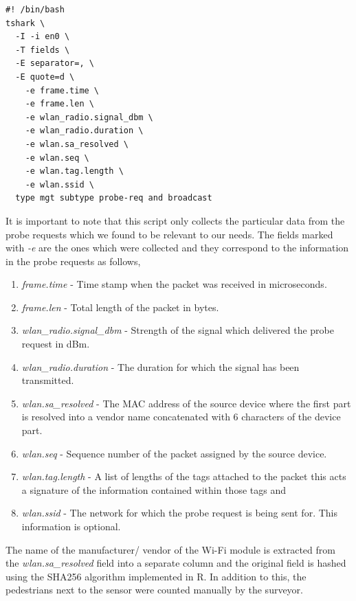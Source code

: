 \begin{verbatim}
#! /bin/bash
tshark \
  -I -i en0 \
  -T fields \
  -E separator=, \
  -E quote=d \
    -e frame.time \
    -e frame.len \
    -e wlan_radio.signal_dbm \
    -e wlan_radio.duration \
    -e wlan.sa_resolved \
    -e wlan.seq \
    -e wlan.tag.length \
    -e wlan.ssid \
  type mgt subtype probe-req and broadcast
\end{verbatim}

It is important to note that this script only collects the particular data from the probe requests which we found to be relevant to our needs. 
The fields marked with \textit{-e} are the ones which were collected and they correspond to the information in the probe requests as follows,

\begin{enumerate}[rightmargin = 2em, leftmargin = 2em]
  \itemsep-0.25em
  \item \textit{frame.time} - Time stamp when the packet was received in microseconds.
  \item \textit{frame.len} - Total length of the packet in bytes.
  \item \textit{wlan\_radio.signal\_dbm} - Strength of the signal which delivered the probe request in dBm.
  \item \textit{wlan\_radio.duration} - The duration for which the signal has been transmitted.
  \item \textit{wlan.sa\_resolved} - The MAC address of the source device where the first part is resolved into a vendor name concatenated with 6 characters of the device part.
  \item \textit{wlan.seq} - Sequence number of the packet assigned by the source device.
  \item \textit{wlan.tag.length} - A list of lengths of the tags attached to the packet this acts a signature of the information contained within those tags and
  \item \textit{wlan.ssid} - The network for which the probe request is being sent for. This information is optional.
\end{enumerate}

The name of the manufacturer/ vendor of the Wi-Fi module  is extracted from the \textit{wlan.sa\_resolved} field into a separate column and the original field is hashed using the SHA256 algorithm implemented in R.
In addition to this, the pedestrians next to the sensor were counted manually by the surveyor.

